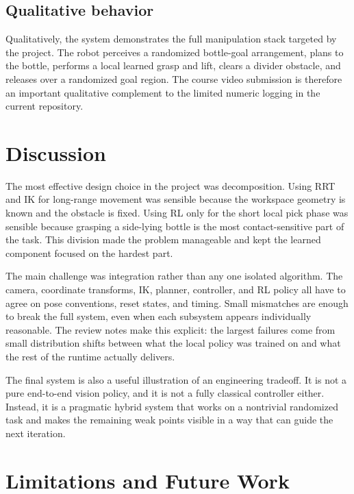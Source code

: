 \documentclass[11pt]{article}
\begin{document}
\subsection{Qualitative behavior}

Qualitatively, the system demonstrates the full manipulation stack targeted by the project. The robot perceives a randomized bottle-goal arrangement, plans to the bottle, performs a local learned grasp and lift, clears a divider obstacle, and releases over a randomized goal region. The course video submission is therefore an important qualitative complement to the limited numeric logging in the current repository.

\section{Discussion}

The most effective design choice in the project was decomposition. Using RRT and IK for long-range movement was sensible because the workspace geometry is known and the obstacle is fixed. Using RL only for the short local pick phase was sensible because grasping a side-lying bottle is the most contact-sensitive part of the task. This division made the problem manageable and kept the learned component focused on the hardest part.

The main challenge was integration rather than any one isolated algorithm. The camera, coordinate transforms, IK, planner, controller, and RL policy all have to agree on pose conventions, reset states, and timing. Small mismatches are enough to break the full system, even when each subsystem appears individually reasonable. The review notes make this explicit: the largest failures come from small distribution shifts between what the local policy was trained on and what the rest of the runtime actually delivers.

The final system is also a useful illustration of an engineering tradeoff. It is not a pure end-to-end vision policy, and it is not a fully classical controller either. Instead, it is a pragmatic hybrid system that works on a nontrivial randomized task and makes the remaining weak points visible in a way that can guide the next iteration.

\section{Limitations and Future Work}
\end{document}
